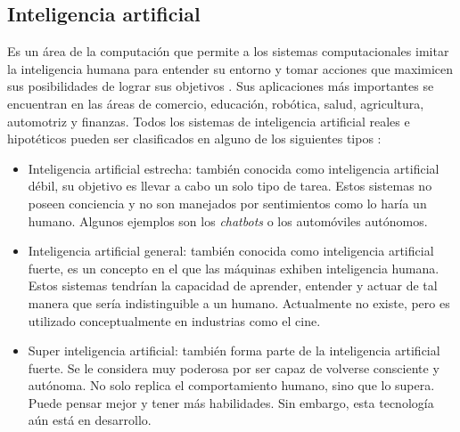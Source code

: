 \subsection{Inteligencia artificial}
Es un área de la computación que permite a los sistemas computacionales imitar la inteligencia humana para entender su entorno y tomar acciones que maximicen sus posibilidades de lograr sus objetivos \cite{ai_def}. Sus aplicaciones más importantes se encuentran en las áreas de comercio, educación, robótica, salud, agricultura, automotriz y finanzas\cite{ai_apps}. Todos los sistemas de inteligencia artificial reales e hipotéticos pueden ser clasificados en alguno de los siguientes tipos \cite{ai_types}:
\begin{itemize}
	\item Inteligencia artificial estrecha: también conocida como inteligencia artificial débil, su objetivo es llevar a cabo un solo tipo de tarea. Estos sistemas no poseen conciencia y no son manejados por sentimientos como lo haría un humano. Algunos ejemplos son los \textit{chatbots} o los automóviles autónomos.
	\item Inteligencia artificial general: también conocida como inteligencia artificial fuerte, es un concepto en el que las máquinas exhiben inteligencia humana. Estos sistemas tendrían la capacidad de aprender, entender y actuar de tal manera que sería indistinguible a un humano. Actualmente no existe, pero es utilizado conceptualmente en industrias como el cine.
	\item Super inteligencia artificial: también forma parte de la inteligencia artificial fuerte. Se le considera muy poderosa por ser capaz de volverse consciente y autónoma. No solo replica el comportamiento humano, sino que lo supera. Puede pensar mejor y tener más habilidades. Sin embargo, esta tecnología aún está en desarrollo.
\end{itemize}

